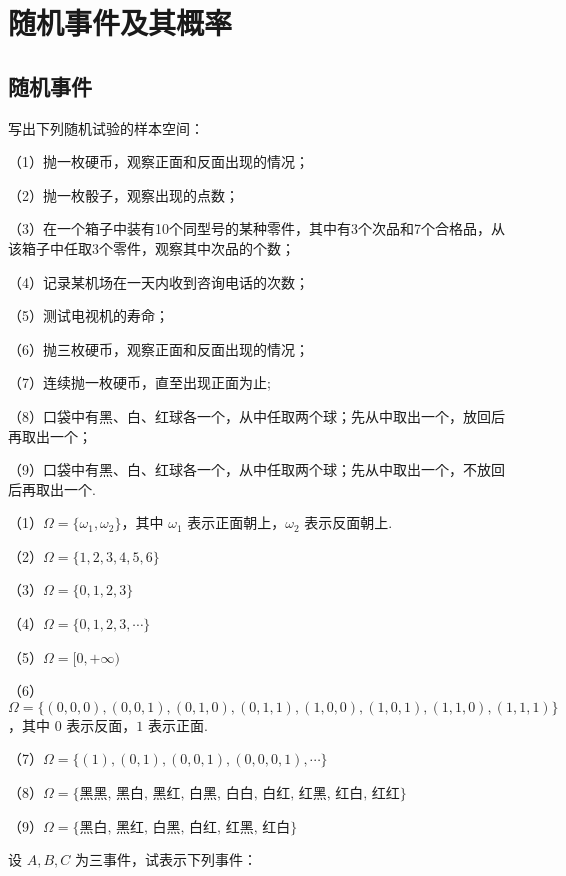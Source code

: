 
\chapter{随机事件及其概率}
\thispagestyle{plain}

\section{随机事件}

\question 写出下列随机试验的样本空间：

（1）抛一枚硬币，观察正面和反面出现的情况；

（2）抛一枚骰子，观察出现的点数；

（3）在一个箱子中装有10个同型号的某种零件，其中有3个次品和7个合格品，从该箱子中任取3个零件，观察其中次品的个数；

（4）记录某机场在一天内收到咨询电话的次数；

（5）测试电视机的寿命；

（6）抛三枚硬币，观察正面和反面出现的情况；

（7）连续抛一枚硬币，直至出现正面为止;

（8）口袋中有黑、白、红球各一个，从中任取两个球；先从中取出一个，放回后再取出一个；

（9）口袋中有黑、白、红球各一个，从中任取两个球；先从中取出一个，不放回后再取出一个.

\begin{solution}
    （1）$\varOmega = \{ \omega_1, \omega_2 \}$，其中 $\omega_1$ 表示正面朝上，$\omega_2$ 表示反面朝上.

    （2）$\varOmega = \{ 1,2,3,4,5,6 \}$

    （3）$\varOmega = \{ 0,1,2,3 \}$

    （4）$\varOmega = \{ 0,1,2,3,\cdots \}$

    （5）$\varOmega = [0, +\infty)$

    （6）$\varOmega = \{ (0,0,0), (0,0,1), (0,1,0), (0,1,1), (1,0,0), (1,0,1), (1,1,0), (1,1,1) \}$，其中 $0$ 表示反面，$1$ 表示正面.

    （7）$\varOmega = \{ (1), (0,1), (0,0,1), (0,0,0,1), \cdots \}$

    （8）$\varOmega = \{ \text{黑黑, 黑白, 黑红, 白黑, 白白, 白红, 红黑, 红白, 红红} \}$

    （9）$\varOmega = \{ \text{黑白, 黑红, 白黑, 白红, 红黑, 红白} \}$
\end{solution}

\question 设 $A,B,C$ 为三事件，试表示下列事件：

